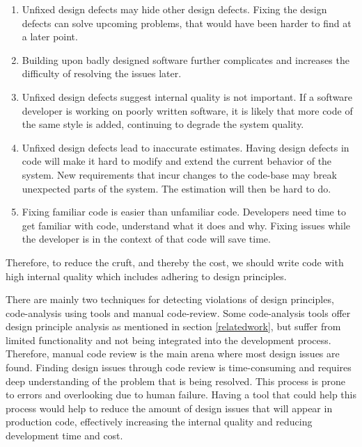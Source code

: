 \documentclass[pdftex,10pt,b5paper,twoside]{report}
\begin{document}
\begin{enumerate}
    \item Unfixed design defects may hide other design defects. Fixing the design defects can solve upcoming problems, that would have been harder to find at a later point.
    \item Building upon badly designed software further complicates and increases the difficulty of resolving the issues later.
  
    \item Unfixed design defects suggest internal quality is not important. If a software developer is working on poorly written software, it is likely that more code of the same style is added, continuing to degrade the system quality.
   
    \item Unfixed design defects lead to inaccurate estimates. Having design defects in code will make it hard to modify and extend the current behavior of the system. New requirements that incur changes to the code-base may break unexpected parts of the system. The estimation will then be hard to do.
   
    \item Fixing familiar code is easier than unfamiliar code. Developers need time to get familiar with code, understand what it does and why. Fixing issues while the developer is in the context of that code will save time.
\end{enumerate}

Therefore, to reduce the cruft, and thereby the cost, we should write code with high internal quality which includes adhering to design principles.



There are mainly two techniques for detecting violations of design principles, code-analysis using tools and manual code-review. Some code-analysis tools offer design principle analysis as mentioned in section \ref{relatedwork}, but suffer from limited functionality and not being integrated into the development process. Therefore, manual code review is the main arena where most design issues are found. Finding design issues through code review is time-consuming and requires deep understanding of the problem that is being resolved. This process is prone to errors and overlooking due to human failure. Having a tool that could help this process would help to reduce the amount of design issues that will appear in production code, effectively increasing the internal quality and reducing development time and cost.
\end{document}
